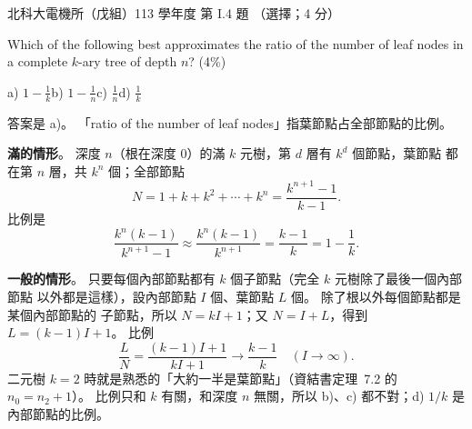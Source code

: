 \begin{pastexam}[label={px:ntut-113-ee-ds-04}]{北科大電機所（戊組）113 學年度 第 I.4 題}
（選擇；4 分）

Which of the following best approximates the ratio of the number of leaf nodes in a complete
$k$-ary tree of depth $n$? (4\%)

a) $1-\frac{1}{k}$\qquad b) $1-\frac{1}{n}$\qquad c) $\frac{1}{n}$\qquad d) $\frac{1}{k}$
\end{pastexam}

\begin{pastsoln}
答案是 a)。 「ratio of the number of leaf nodes」指葉節點占全部節點的比例。

\textbf{滿的情形}。 深度 $n$（根在深度 $0$）的滿 $k$ 元樹，第 $d$ 層有 $k^d$ 個節點，葉節點
都在第 $n$ 層，共 $k^n$ 個；全部節點
\[
N = 1 + k + k^2 + \cdots + k^n = \frac{k^{n+1} - 1}{k - 1}.
\]
比例是
\[
\frac{k^n (k - 1)}{k^{n+1} - 1} \approx \frac{k^n (k-1)}{k^{n+1}} = \frac{k - 1}{k} = 1 - \frac{1}{k}.
\]

\textbf{一般的情形}。 只要每個內部節點都有 $k$ 個子節點（完全 $k$ 元樹除了最後一個內部節點
以外都是這樣），設內部節點 $I$ 個、葉節點 $L$ 個。 除了根以外每個節點都是某個內部節點的
子節點，所以 $N = kI + 1$；又 $N = I + L$，得到 $L = (k - 1)I + 1$。 比例
\[
\frac{L}{N} = \frac{(k-1)I + 1}{kI + 1} \to \frac{k - 1}{k} \quad (I \to \infty).
\]
二元樹 $k = 2$ 時就是熟悉的「大約一半是葉節點」（資結書定理~7.2 的 $n_0 = n_2 + 1$）。 比例只和
$k$ 有關，和深度 $n$ 無關，所以 b)、c) 都不對；d) $1/k$ 是內部節點的比例。
\end{pastsoln}
